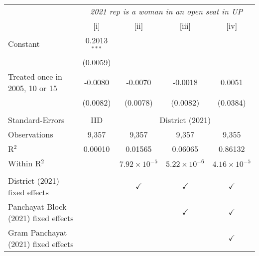 
\begingroup
\centering
\begin{tabular}{lcccc}
   \toprule
    & \multicolumn{4}{c}{\textit{2021 rep is a woman in an open seat in UP}}\\
                                        & [i]            & [ii]                  & [iii]                 & [iv]\\  
   \midrule 
   Constant                             & 0.2013$^{***}$ &                       &                       &   \\   
                                        & (0.0059)       &                       &                       &   \\   
   Treated once in 2005, 10 or 15       & -0.0080        & -0.0070               & -0.0018               & 0.0051\\   
                                        & (0.0082)       & (0.0078)              & (0.0082)              & (0.0384)\\   
    \\
   Standard-Errors & IID & \multicolumn{3}{c}{District (2021)} \\ 
   Observations                         & 9,357          & 9,357                 & 9,357                 & 9,355\\  
   R$^2$                                & 0.00010        & 0.01565               & 0.06065               & 0.86132\\  
   Within R$^2$                         &                & $7.92\times 10^{-5}$  & $5.22\times 10^{-6}$  & $4.16\times 10^{-5}$\\   
    \\
   District (2021) fixed effects        &                & $\checkmark$          & $\checkmark$          & $\checkmark$\\   
   Panchayat Block (2021) fixed effects &                &                       & $\checkmark$          & $\checkmark$\\   
   Gram Panchayat (2021) fixed effects  &                &                       &                       & $\checkmark$\\   
   \bottomrule
\end{tabular}
\par\endgroup


